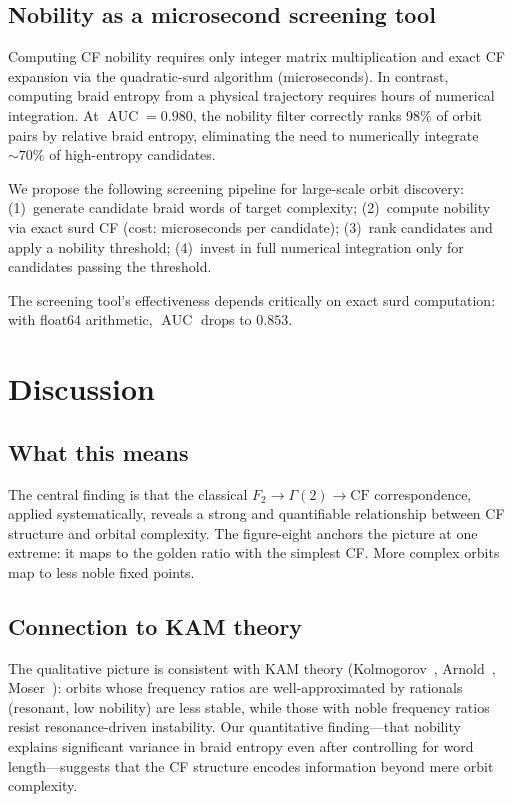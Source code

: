 \documentclass[11pt]{article}
\theoremstyle{definition}
\DeclareMathOperator{\AUC}{AUC}
\begin{document}
\subsection{Nobility as a microsecond screening tool}

Computing CF nobility requires only integer matrix multiplication
and exact CF expansion via the quadratic-surd algorithm (microseconds).
In contrast, computing braid entropy from a physical trajectory
requires hours of numerical integration. At $\AUC = 0.980$, the
nobility filter correctly ranks 98\% of orbit pairs by relative
braid entropy, eliminating the need to numerically integrate
${\sim}\!70\%$ of high-entropy candidates.

We propose the following screening pipeline for large-scale orbit
discovery: (1)~generate candidate braid words of target complexity;
(2)~compute nobility via exact surd CF (cost: microseconds per
candidate); (3)~rank candidates and apply a nobility threshold;
(4)~invest in full numerical integration only for candidates
passing the threshold.

The screening tool's effectiveness depends critically on exact surd
computation: with float64 arithmetic, $\AUC$ drops to $0.853$.


\section{Discussion}\label{sec:discussion}

\subsection{What this means}

The central finding is that the classical
$F_2 \to \Gamma(2) \to \text{CF}$ correspondence, applied
systematically, reveals a strong and quantifiable relationship
between CF structure and orbital complexity. The figure-eight
anchors the picture at one extreme: it maps to the golden ratio
with the simplest CF. More complex orbits map to less noble fixed
points.

\subsection{Connection to KAM theory}

The qualitative picture is consistent with KAM theory
(Kolmogorov~\cite{Kolmogorov1954}, Arnold~\cite{Arnold1963},
Moser~\cite{Moser1962}): orbits whose frequency ratios are
well-approximated by rationals (resonant, low nobility) are less
stable, while those with noble frequency ratios resist
resonance-driven instability.  Our quantitative finding---that
nobility explains significant variance in braid entropy even after
controlling for word length---suggests that the CF structure encodes
information beyond mere orbit complexity.
\end{document}
